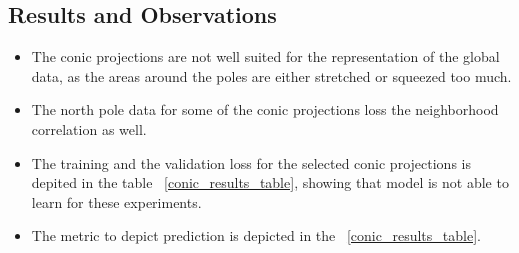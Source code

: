 \subsection{Results and Observations}
\begin{itemize}
    \item The conic projections are not well suited for the representation of the global data, as the areas around the poles are either stretched or squeezed too much.
    \item The north pole data for some of the conic projections loss the neighborhood correlation as well.
    \item The training and the validation loss for the selected conic projections is depited in the table ~\ref{conic_results_table}, showing that model is not able to learn for these experiments.
    \item The metric to depict prediction is depicted in the ~\ref{conic_results_table}.
\end{itemize}

